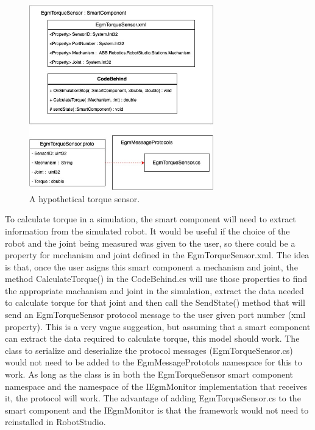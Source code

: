 \documentclass{cslthse-msc}
\begin{document}
\begin{appendices}
\begin{figure}[H]
    \centering
    \includegraphics[width=8cm]{torque_sensor.jpg}
    \caption{A hypothetical torque sensor.}
    \label{fig:torque_sensor}
\end{figure}

To calculate torque in a simulation, the smart component will need to extract information from the simulated robot. It would be useful if the choice of the robot and the joint being measured was given to the user, so there could be a property for mechanism and joint defined in the EgmTorqueSensor.xml. The idea is that, once the user asigns this smart component a mechanism and joint, the method CalculateTorque() in the CodeBehind.cs will use those properties to find the appropriate machanism and joint in the simulation, extract the data needed to calculate torque for that joint and then call the SendState() method that will send an EgmTorqueSensor protocol message to the user given port number (xml property). This is a very vague suggestion, but assuming that a smart component can extract the data required to calculate torque, this model should work. The class to serialize and deserialize the protocol messages (EgmTorqueSensor.cs) would not need to be added to the EgmMessagePrototols namespace for this to work. As long as the class is in both the EgmTorqueSensor smart component namespace and the namespace of the IEgmMonitor implementation that receives it, the protocol will work. The advantage of adding EgmTorqueSensor.cs to the smart component and the IEgmMonitor is that the framework would not need to reinstalled in RobotStudio. 

\newpage

\end{appendices}
\end{document}
